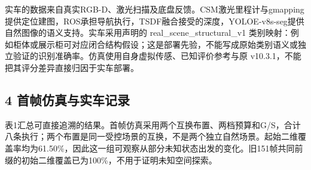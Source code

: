 \documentclass[]{article}
\begin{document}
实车的数据来自真实RGB-D、激光扫描及底盘反馈。CSM激光里程计与gmapping提供定位建图，ROS承担导航执行，TSDF融合接受的深度，YOLOE-v8s-seg提供自然图像的语义支持。实车采用声明的
real\_scene\_structural\_v1
类别映射：例如柜体或展示柜可对应闭合结构假设；这是部署先验，不能写成原始类别语义或独立验证的识别准确率。仿真使用自身虚拟传感、已知评价参考与原
v10.3.1，不能把其评分差异直接归因于实车部署。

\hypertarget{ux9996ux5e27ux4effux771fux4e0eux5b9eux8f66ux8bb0ux5f55}{%
\subsection{4
首帧仿真与实车记录}\label{ux9996ux5e27ux4effux771fux4e0eux5b9eux8f66ux8bb0ux5f55}}

表1汇总可直接追溯的结果。首帧仿真采用两个互换布置、两档预算和G/S，合计八条执行；两个布置是同一受控场景的互换，不是两个独立自然场景。起始二维覆盖率均为61.50\%，因此这一组可观察从部分未知状态出发的变化。旧151帧共同前缀的初始二维覆盖已为100\%，不用于证明未知空间探索。
\end{document}
